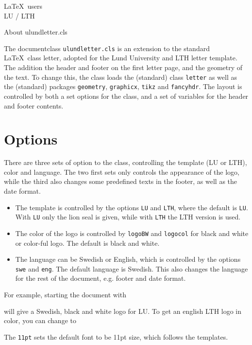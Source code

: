 \documentclass[11pt,eng,LTH,logoBW]{ulundletter}
\begin{document}
\begin{letter}{\LaTeX\ users\\ LU / LTH}
  \opening{About ulundletter.cls}
  The documentclass \texttt{ulundletter.cls} is an extension to the standard \LaTeX\ class letter, adopted for the Lund University and LTH letter template. The addition the header and footer on the first letter page, and the geometry of the text. To change this, the class loads the (standard) class \texttt{letter} as well as the (standard) packages \texttt{geometry}, \texttt{graphicx}, \texttt{tikz} and \texttt{fancyhdr}. The layout is controlled by both a set options for the class, and a set of variables for the header and footer contents.

  \section{Options}
  There are three sets of option to the class, controlling the template (LU or LTH), color and language. The two first sets only controls the appearance of the logo, while the third also changes some predefined texts in the footer, as well as the date format.
  \begin{itemize}
  \item The template is controlled by the options \texttt{LU} and \texttt{LTH}, where the default is \texttt{LU}. With \texttt{LU} only the lion seal is given, while with \texttt{LTH} the LTH version is used. 
  \item The color of the logo is controlled by \texttt{logoBW} and \texttt{logocol} for black and white or color-ful logo. The default is black and white.
  \item The language can be Swedish or English, which is controlled by the options \texttt{swe} and \texttt{eng}. The default language is Swedish. This also changes the language for the rest of the document, e.g. footer and date format.
  \end{itemize}
  For example, starting the document with 
  will give a Swedish, black and white logo for LU. To get an english LTH logo in color, you can change to 
  The \texttt{11pt} sets the default font to be 11pt size, which follows the templates.
  

\end{letter}
\end{document}
